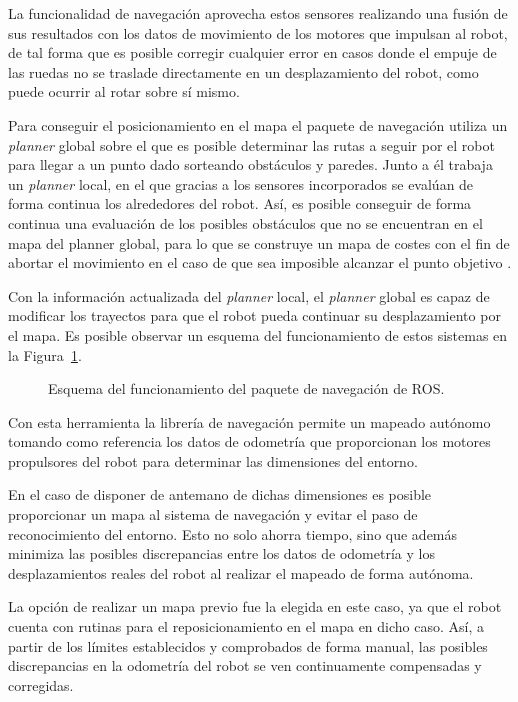 La funcionalidad de navegación aprovecha estos sensores realizando una fusión de sus resultados con los datos de movimiento de los motores que impulsan al robot, de tal forma que es posible corregir cualquier error en casos donde el empuje de las ruedas no se traslade directamente en un desplazamiento del robot, como puede ocurrir al rotar sobre sí mismo.

Para conseguir el posicionamiento en el mapa el paquete de navegación utiliza un \textit{planner} global sobre el que es posible determinar las rutas a seguir por el robot para llegar a un punto dado sorteando obstáculos y paredes.
Junto a él trabaja un \textit{planner} local, en el que gracias a los sensores incorporados se evalúan de forma continua los alrededores del robot.
Así, es posible conseguir de forma continua una evaluación de los posibles obstáculos que no se encuentran en el mapa del planner global, para lo que se construye un mapa de costes con el fin de abortar el movimiento en el caso de que sea imposible alcanzar el punto objetivo \cite{ROSDoc}.

Con la información actualizada del \textit{planner} local, el \textit{planner} global es capaz de modificar los trayectos para que el robot pueda continuar su desplazamiento por el mapa.
Es posible observar un esquema del funcionamiento de estos sistemas en la Figura~\ref{fig:move_base}.

\begin{figure}[H]
    \centering
    \def\svgwidth{0.8\linewidth}
    
	\caption{Esquema del funcionamiento del paquete de navegación de ROS.}
    \label{fig:move_base}
\end{figure}

Con esta herramienta la librería de navegación permite un mapeado autónomo tomando como referencia los datos de odometría que proporcionan los motores propulsores del robot para determinar las dimensiones del entorno.

En el caso de disponer de antemano de dichas dimensiones es posible proporcionar un mapa al sistema de navegación y evitar el paso de reconocimiento del entorno.
Esto no solo ahorra tiempo, sino que además minimiza las posibles discrepancias entre los datos de odometría y los desplazamientos reales del robot al realizar el mapeado de forma autónoma.

La opción de realizar un mapa previo fue la elegida en este caso, ya que el robot cuenta con rutinas para el reposicionamiento en el mapa en dicho caso.
Así, a partir de los límites establecidos y comprobados de forma manual, las posibles discrepancias en la odometría del robot se ven continuamente compensadas y corregidas.

